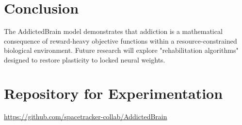 \documentclass[12pt]{article}
\begin{document}
\section{Conclusion}
The AddictedBrain model demonstrates that addiction is a mathematical consequence of reward-heavy objective functions within a resource-constrained biological environment. Future research will explore "rehabilitation algorithms" designed to restore plasticity to locked neural weights.

\section{Repository for Experimentation}
\noindent
\url{https://github.com/spacetracker-collab/AddictedBrain}
\end{document}
